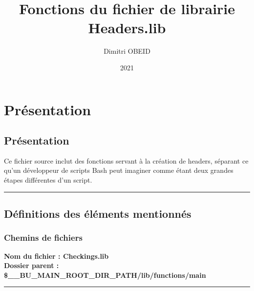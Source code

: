 \documentclass[a4paper,10pt]{article}
\title{\color{red}Fonctions du fichier de librairie \color{lime}Headers.lib}\color{white}
\author{Dimitri OBEID}
\date{2021}
\begin{document}
\maketitle
\newpage

\hypertarget{contents}{}
\tableofcontents
\newpage

\color{red}
\section{Présentation}\color{white}

\color{green}
\subsection{Présentation}\color{white}

\begin{justify}
    Ce fichier source inclut des fonctions servant à la création de headers, séparant ce qu'un développeur de scripts Bash peut imaginer comme étant deux grandes étapes différentes d'un script.
\end{justify}




\color{green}\par\noindent\rule{\textwidth}{0.4pt}\color{white}

\color{green}
\subsection{Définitions des éléments mentionnés}\color{white}

\color{blue}
\subsubsection{Chemins de fichiers}\color{white}

\textbf{Nom du fichier : \color{lime}Checkings.lib}\\[1\baselineskip]

\textbf{Dossier parent : \color{orange}\$\_\_BU\_MAIN\_ROOT\_DIR\_PATH\color{lime}/lib/functions/main}\\[1\baselineskip]



\color{lime}\par\noindent\rule{\textwidth}{0.4pt}\color{white}\\[1\baselineskip]
\end{document}
